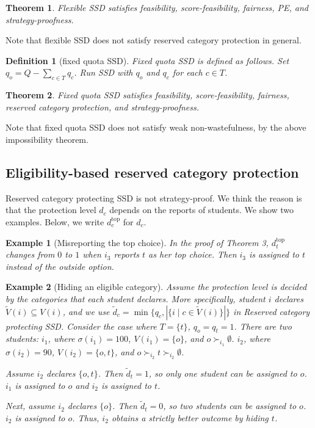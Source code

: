 \documentclass{article}
\newtheorem{example}{Example}
\newtheorem{theorem}{Theorem}
\newtheorem{definition}{Definition}
\begin{document}
\begin{theorem}
Flexible SSD
satisfies feasibility, score-feasibility, fairness, PE, and strategy-proofness.
\end{theorem}
Note that flexible SSD does not satisfy reserved category protection in general.

\begin{definition}[fixed quota SSD]
Fixed quota SSD is defined as follows. 
Set $q_o = Q - \sum_{c \in T} q_c$. 
Run SSD with $q_o$ and $q_c$ for each $c \in T$.
\end{definition}
\begin{theorem}
Fixed quota SSD satisfies feasibility, score-feasibility, fairness, reserved category protection, and strategy-proofness.      
\end{theorem}
Note that fixed quota SSD does not satisfy weak non-wastefulness, by the above impossibility theorem. 


\subsection{Eligibility-based reserved category protection}
Reserved category protecting SSD is not strategy-proof.
We think the reason is that the protection level $d_c$ depends on the reports of students.
We show two examples. Below, we write $d^{\mathrm{top}}_c$ for $d_c$.

\begin{example}[Misreporting the top choice]
In the proof of Theorem 3, $d^{\mathrm{top}}_t$ changes from $0$ to $1$ when $i_3$
reports $t$ as her top choice.
Then $i_3$ is assigned to $t$ instead of the outside option.
\end{example}

\begin{example}[Hiding an eligible category]
Assume the protection level is decided by the categories that each student declares.
More specifically, student $i$ declares $\tilde{V}(i)\subseteq V(i)$, and we use
$\tilde{d}_c=\min\{q_c, |\{i \mid c \in \tilde{V}(i)\}|\}$ in
Reserved category protecting SSD.
Consider the case where $T=\{t\}$, $q_o=q_t=1$.
There are two students: $i_1$, where $\sigma(i_1)=100$, $V(i_1)=\{o\}$, and
$o\succ_{i_1}\emptyset$.
$i_2$, where $\sigma(i_2)=90$, $V(i_2)=\{o,t\}$, and
$o\succ_{i_2} t\succ_{i_2}\emptyset$.

Assume $i_2$ declares $\{o,t\}$. Then $\tilde{d}_t=1$, so only one student can be assigned to $o$.
$i_1$ is assigned to $o$ and $i_2$ is assigned to $t$.

Next, assume $i_2$ declares $\{o\}$. Then $\tilde{d}_t=0$, so two students can be assigned to $o$.
$i_2$ is assigned to $o$.
Thus, $i_2$ obtains a strictly better outcome by hiding $t$.
\end{example}
\end{document}
